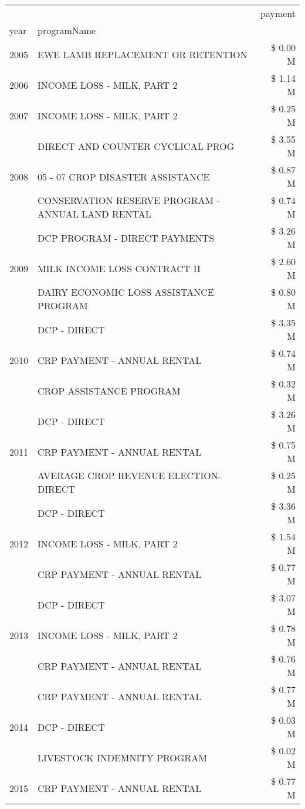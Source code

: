 \begin{tabular}{llr}
\toprule
 &  & payment \\
year & programName &  \\
\midrule
2005 & EWE LAMB REPLACEMENT OR RETENTION & \$ 0.00 M \\
\cline{1-3}
2006 & INCOME LOSS - MILK, PART 2 & \$ 1.14 M \\
\cline{1-3}
2007 & INCOME LOSS - MILK, PART 2 & \$ 0.25 M \\
\cline{1-3}
\multirow[t]{3}{*}{2008} & DIRECT AND COUNTER CYCLICAL PROG & \$ 3.55 M \\
 & 05 - 07 CROP DISASTER ASSISTANCE & \$ 0.87 M \\
 & CONSERVATION RESERVE PROGRAM - ANNUAL LAND RENTAL & \$ 0.74 M \\
\cline{1-3}
\multirow[t]{3}{*}{2009} & DCP PROGRAM - DIRECT PAYMENTS & \$ 3.26 M \\
 & MILK INCOME LOSS CONTRACT II & \$ 2.60 M \\
 & DAIRY ECONOMIC LOSS ASSISTANCE PROGRAM & \$ 0.80 M \\
\cline{1-3}
\multirow[t]{3}{*}{2010} & DCP - DIRECT & \$ 3.35 M \\
 & CRP PAYMENT - ANNUAL RENTAL & \$ 0.74 M \\
 & CROP ASSISTANCE PROGRAM & \$ 0.32 M \\
\cline{1-3}
\multirow[t]{3}{*}{2011} & DCP - DIRECT & \$ 3.26 M \\
 & CRP PAYMENT - ANNUAL RENTAL & \$ 0.75 M \\
 & AVERAGE CROP REVENUE ELECTION-DIRECT & \$ 0.25 M \\
\cline{1-3}
\multirow[t]{3}{*}{2012} & DCP - DIRECT & \$ 3.36 M \\
 & INCOME LOSS - MILK, PART 2 & \$ 1.54 M \\
 & CRP PAYMENT - ANNUAL RENTAL & \$ 0.77 M \\
\cline{1-3}
\multirow[t]{3}{*}{2013} & DCP - DIRECT & \$ 3.07 M \\
 & INCOME LOSS - MILK, PART 2 & \$ 0.78 M \\
 & CRP PAYMENT - ANNUAL RENTAL & \$ 0.76 M \\
\cline{1-3}
\multirow[t]{3}{*}{2014} & CRP PAYMENT - ANNUAL RENTAL & \$ 0.77 M \\
 & DCP - DIRECT & \$ 0.03 M \\
 & LIVESTOCK INDEMNITY PROGRAM & \$ 0.02 M \\
\cline{1-3}
\multirow[t]{3}{*}{2015} & CRP PAYMENT - ANNUAL RENTAL & \$ 0.77 M \\

\end{tabular}
